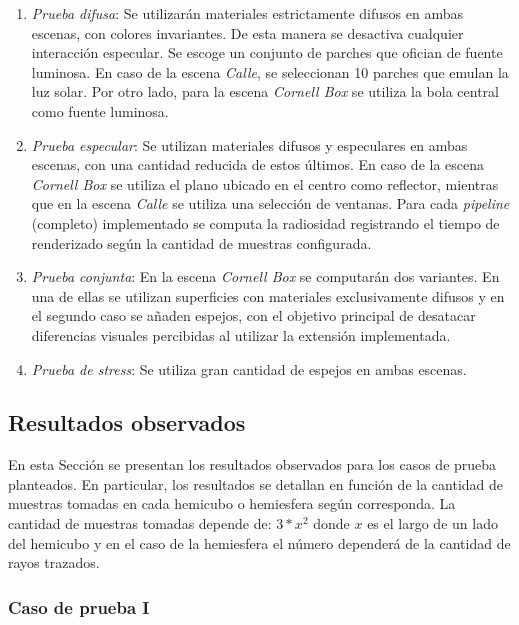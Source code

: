 \begin{enumerate}
	\item \textit{Prueba difusa}: Se utilizarán materiales estrictamente difusos en ambas escenas, con colores invariantes. De esta manera se desactiva cualquier interacción especular. Se escoge un conjunto de parches que ofician de fuente luminosa. En caso de la escena \textit{Calle}, se seleccionan 10 parches que emulan la luz solar. Por otro lado, para la escena \textit{Cornell Box} se utiliza la bola central como fuente luminosa.
	\item \textit{Prueba especular}: Se utilizan materiales difusos y especulares en ambas escenas, con una cantidad reducida de estos últimos. En caso de la escena \textit{Cornell Box} se utiliza el plano ubicado en el centro como reflector, mientras que en la escena \textit{Calle} se utiliza una selección de ventanas. Para cada \textit{pipeline} (completo) implementado se computa la radiosidad registrando el tiempo de renderizado según la cantidad de muestras configurada.
	\item \textit{Prueba conjunta}: En la escena \textit{Cornell Box} se computarán dos variantes. En una de ellas se utilizan superficies con materiales exclusivamente difusos y en el segundo caso se añaden espejos, con el objetivo principal de desatacar diferencias visuales percibidas al utilizar la extensión implementada.
	\item \textit{Prueba de stress}: Se utiliza gran cantidad de espejos en ambas escenas.
\end{enumerate}

\subsection{Resultados observados}

En esta Sección se presentan los resultados observados para los casos de prueba planteados. En particular, los resultados se detallan en función de la cantidad de muestras tomadas en cada hemicubo o hemiesfera según corresponda. La cantidad de muestras tomadas depende de: $3 * x^{2}$ donde $x$ es el largo de un lado del hemicubo y en el caso de la hemiesfera el número dependerá de la cantidad de rayos trazados.


\subsubsection{Caso de prueba I}

